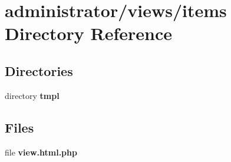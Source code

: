 \section{administrator/views/items Directory Reference}
\label{dir_07c77ccee64694df847d0f3e2ff8417f}
\subsection*{Directories}
\begin{DoxyCompactItemize}
\item 
directory \textbf{ tmpl}
\end{DoxyCompactItemize}
\subsection*{Files}
\begin{DoxyCompactItemize}
\item 
file \textbf{ view.\+html.\+php}
\end{DoxyCompactItemize}
